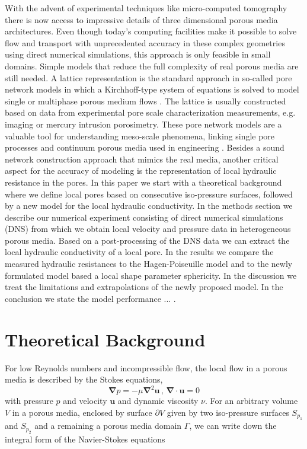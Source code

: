 \documentclass[draft]{agujournal2019}
\begin{document}
With the advent of experimental techniques like micro-computed tomography there is now access to impressive details of three dimensional porous media architectures. Even though today’s computing facilities make it possible to solve flow and transport with unprecedented accuracy in these complex geometries using direct numerical simulations, this approach is only feasible in small domains. Simple models that reduce the full complexity of real porous media are still needed. A lattice representation is the standard approach in so-called pore network models in which a Kirchhoff-type system of equations is solved to model single or multiphase porous medium flows . The lattice is usually constructed based on data from experimental pore scale characterization measurements, e.g. imaging or mercury intrusion porosimetry. These pore network models are a valuable tool for understanding meso-scale phenomena, linking single pore processes and continuum porous media used in engineering . Besides a sound network construction approach that mimics the real media, another critical aspect for the accuracy of modeling is the representation of local hydraulic resistance in the pores. 
In this paper we start with a theoretical background where we define local pores based on consecutive iso-pressure surfaces, followed by a new model for the local hydraulic conductivity. In the methods section we describe our numerical experiment consisting of direct numerical simulations (DNS) from which we obtain local velocity and pressure data in heterogeneous porous media. Based on a post-processing of the DNS data we can extract the local hydraulic conductivity of a local pore. In the results we compare the measured hydraulic resistances to the Hagen-Poiseuille model and to the newly formulated model based a local shape parameter sphericity. In the discussion we treat the limitations and extrapolations of the newly proposed model. In the conclusion we state the model performance ... . 



\section{Theoretical Background}

For low Reynolds numbers and incompressible flow, the local flow in a porous media is described by the Stokes equations,
\begin{equation}
	\mathbf{\nabla} p = - \mu\mathbf{\nabla}^2 \mathbf{u}\,,\,\mathbf{\nabla}\cdot\mathbf{u}=0\label{eq:stokes_local}
	\end{equation}
with pressure $p$ and velocity $\mathbf{u}$ and dynamic viscosity $\nu$. For an arbitrary volume $V$ in a porous media, enclosed by surface $\partial V$ given by two iso-pressure surfaces $S_{p_1}$ and $S_{p_2}$ and a remaining a porous media domain $\Gamma$, we can write down the integral form of the Navier-Stokes equations
{}
\end{document}
